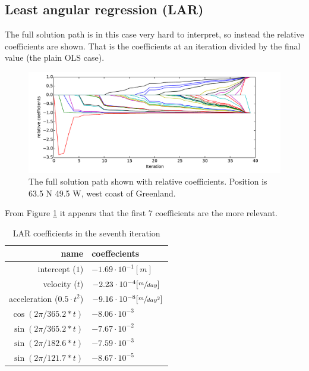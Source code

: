 \pagebreak
\subsection{Least angular regression (LAR)}

The full solution path is in this case very hard to interpret, so instead the relative coefficients are shown. That is the coefficients at an iteration divided by the final value (the plain OLS case).

\begin{figure}[H]
	\centering
	\includegraphics[width=\textwidth]{figures/lar-coefficients}
	\caption{The full solution path shown with relative coefficients. Position is 63.5 N 49.5 W, west coast of Greenland.}
	\label{fig:lar-coefficients}
\end{figure}

From Figure \ref{fig:lar-coefficients} it appears that the first 7 coefficients are the more relevant. 
\begin{table}[H]
\centering
\begin{tabular}{r|l}
name                 & coeffecients \\ \hline
intercept ($1$) & $-1.69 \cdot 10^{-1}[m]$ \\
velocity ($t$) & $-2.23 \cdot 10^{-4} [\sfrac{m}{day}]$ \\
acceleration ($0.5 \cdot t^2$) & $-9.16 \cdot 10^{-8} [\sfrac{m}{day^2}] $ \\
$\cos(2 \pi /365.2 * t)$ & $-8.06 \cdot 10^{-3}$ \\
$\sin(2 \pi /365.2 * t)$ & $-7.67 \cdot 10^{-2}$ \\
$\sin(2 \pi /182.6 * t)$ & $-7.59 \cdot 10^{-3}$ \\
$\sin(2 \pi /121.7 * t)$ & $-8.67 \cdot 10^{-5}$
\end{tabular}
\caption{LAR coefficients in the seventh iteration}
\end{table}

